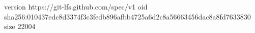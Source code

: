 version https://git-lfs.github.com/spec/v1
oid sha256:010437edc8d3374f3c3fedb896afbb4725a6d2c8a56663456dac8a8fd7633830
size 22004

